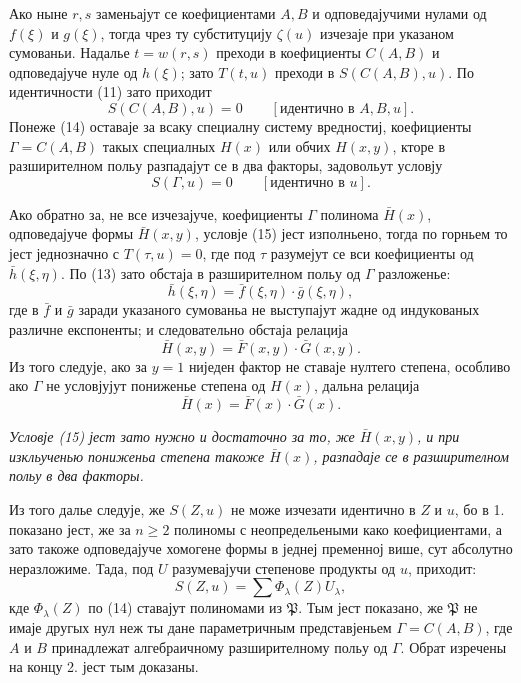 ﻿\documentclass[11pt]{article}
\begin{document}
Ако ныне $r,s$ заменьајут се коефициентами $A,B$ и одповедајучими нулами од $f(\xi)$ и $g(\xi)$, тогда чрез ту субституцију $\zeta(u)$ изчезаје при указаном сумованьи. Надалье $t=w(r,s)$ преходи в коефициенты $C(A,B)$ и одповедајуче нуле од $h(\xi)$; зато $T(t,u)$ преходи в $S(C(A,B),u)$. По идентичности (11) зато приходит
\begin{equation}
 S(C(A,B),u)=0\qquad[\text{идентично в }A,B,u].
\tag{14}
\end{equation}
Понеже (14) оставаје за всаку специалну систему вредностиј, коефициенты $\Gamma=C(A,B)$ такых специалных $H(x)$ или обчих $H(x,y)$, кторе в разширителном польу разпадајут се в два факторы, задовольут условју
\begin{equation}
 S(\Gamma,u)=0\qquad[\text{идентично в }u].
\tag{15}
\end{equation}

Ако обратно за, не все изчезајуче, коефициенты $\Gamma$ полинома $\bar H(x)$, одповедајуче формы $\bar H(x,y)$, условје (15) јест изполньено, тогда по горньем то јест једнозначно с $T(\tau,u)=0$, где под $\tau$ разумејут се вси коефициенты од $\bar h(\xi,\eta)$. По (13) зато обстаја в разширителном польу од $\Gamma$ разложенье:
\[
 \bar h(\xi,\eta)=\bar f(\xi,\eta)\cdot\bar g(\xi,\eta),
\]
где в $\bar f$ и $\bar g$ заради указаного сумованьа не выступајут жадне од индукованых различне експоненты; и следовательно обстаја релација
\[
 \bar H(x,y)=\bar F(x,y)\cdot\bar G(x,y).
\]
Из того следује, ако за $y=1$ ниједен фактор не ставаје нултего степена, особливо ако $\Gamma$ не условјујут пониженье степена од $H(x)$, дальна релација
\[
 \bar H(x)=\bar F(x)\cdot\bar G(x).
\]

\emph{Условје (15) јест зато нужно и достаточно за то, же $\bar H(x,y)$, и при изкльученью пониженьа степена такоже $\bar H(x)$, разпадаје се в разширителном польу в два факторы.}

Из того далье следује, же $S(Z,u)$ не може изчезати идентично в $Z$ и $u$, бо в 1. показано јест, же за $n\ge2$ полиномы с неопредельеными како коефициентами, а зато такоже одповедајуче хомогене формы в једнеј пременној више, сут абсолутно неразложиме. Тада, под $U$ разумевајучи степенове продукты од $u$, приходит:
\[
 S(Z,u)=\sum \Phi_\lambda(Z)U_\lambda,
\]
кде $\Phi_\lambda(Z)$ по (14) ставајут полиномами из $\mathfrak P$. Тым јест показано, же $\mathfrak P$ не имаје другых нул неж ты дане параметричным представјеньем $\Gamma=C(A,B)$, где $A$ и $B$ принадлежат алгебраичному разширителному польу од $\Gamma$. Обрат изречены на концу 2. јест тым доказаны.
\end{document}
